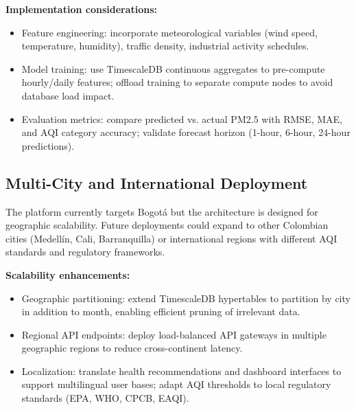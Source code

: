 \textbf{Implementation considerations:}
\begin{itemize}
    \item Feature engineering: incorporate meteorological variables (wind speed, temperature, humidity), traffic density, industrial activity schedules.
    \item Model training: use TimescaleDB continuous aggregates to pre-compute hourly/daily features; offload training to separate compute nodes to avoid database load impact.
    \item Evaluation metrics: compare predicted vs. actual PM2.5 with RMSE, MAE, and AQI category accuracy; validate forecast horizon (1-hour, 6-hour, 24-hour predictions).
\end{itemize}

\subsection{Multi-City and International Deployment}
The platform currently targets Bogotá but the architecture is designed for geographic scalability. Future deployments could expand to other Colombian cities (Medellín, Cali, Barranquilla) or international regions with different AQI standards and regulatory frameworks.

\textbf{Scalability enhancements:}
\begin{itemize}
    \item Geographic partitioning: extend TimescaleDB hypertables to partition by city in addition to month, enabling efficient pruning of irrelevant data.
    \item Regional API endpoints: deploy load-balanced API gateways in multiple geographic regions to reduce cross-continent latency.
    \item Localization: translate health recommendations and dashboard interfaces to support multilingual user bases; adapt AQI thresholds to local regulatory standards (EPA, WHO, CPCB, EAQI).
\end{itemize}

